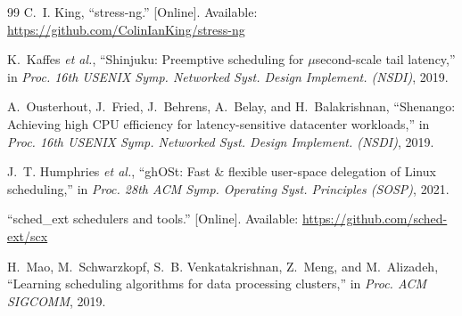 \documentclass[conference]{IEEEtran}
\begin{document}
\begin{thebibliography}{99}
C.~I. King, ``stress-ng.'' [Online]. Available: \url{https://github.com/ColinIanKing/stress-ng}

K.~Kaffes \emph{et al.}, ``Shinjuku: Preemptive scheduling for $\mu$second-scale tail latency,''
in \emph{Proc. 16th USENIX Symp. Networked Syst. Design Implement. (NSDI)}, 2019.

A.~Ousterhout, J.~Fried, J.~Behrens, A.~Belay, and H.~Balakrishnan, ``Shenango: Achieving high CPU
efficiency for latency-sensitive datacenter workloads,'' in \emph{Proc. 16th USENIX Symp.
Networked Syst. Design Implement. (NSDI)}, 2019.

J.~T. Humphries \emph{et al.}, ``ghOSt: Fast \& flexible user-space delegation of Linux
scheduling,'' in \emph{Proc. 28th ACM Symp. Operating Syst. Principles (SOSP)}, 2021.

``sched\_ext schedulers and tools.'' [Online]. Available: \url{https://github.com/sched-ext/scx}

H.~Mao, M.~Schwarzkopf, S.~B. Venkatakrishnan, Z.~Meng, and M.~Alizadeh, ``Learning scheduling
algorithms for data processing clusters,'' in \emph{Proc. ACM SIGCOMM}, 2019.

\end{thebibliography}
\end{document}

